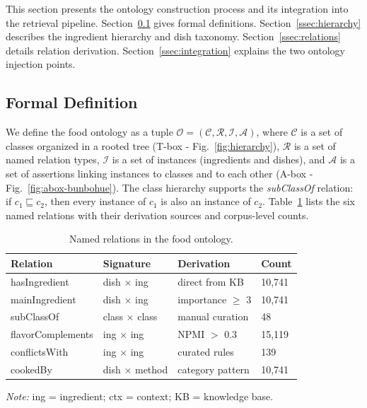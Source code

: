 \label{sec:framework}

This section presents the ontology construction process and its integration into the retrieval pipeline. Section~\ref{ssec:formal} gives formal definitions. Section~\ref{ssec:hierarchy} describes the ingredient hierarchy and dish taxonomy. Section~\ref{ssec:relations} details relation derivation. Section~\ref{ssec:integration} explains the two ontology injection points.

\subsection{Formal Definition}
\label{ssec:formal}

We define the food ontology as a tuple $\mathcal{O} = (\mathcal{C}, \mathcal{R}, \mathcal{I}, \mathcal{A})$, where $\mathcal{C}$ is a set of classes organized in a rooted tree (T-box - Fig.~\ref{fig:hierarchy}), $\mathcal{R}$ is a set of named relation types, $\mathcal{I}$ is a set of instances (ingredients and dishes), and $\mathcal{A}$ is a set of assertions linking instances to classes and to each other (A-box - Fig.~\ref{fig:abox-bunbohue}). The class hierarchy supports the \emph{subClassOf} relation: if $c_1 \sqsubseteq c_2$, then every instance of $c_1$ is also an instance of $c_2$. Table~\ref{tab:relations} lists the six named relations with their derivation sources and corpus-level counts.

\begin{table}[t]
\centering
\caption{Named relations in the food ontology.}
\label{tab:relations}
\small
\begin{tabular}{llll}
\toprule
\textbf{Relation} & \textbf{Signature} & \textbf{Derivation} & \textbf{Count} \\
\midrule
hasIngredient      & dish $\times$ ing            & direct from KB     & 10{,}741 \\
mainIngredient     & dish $\times$ ing            & importance $\geq$ 3 & 10{,}741 \\
subClassOf         & class $\times$ class         & manual curation    & 48 \\
flavorComplements  & ing $\times$ ing             & NPMI $>$ 0.3      & 15{,}119 \\
conflictsWith      & ing $\times$ ing             & curated rules      & 139 \\
cookedBy           & dish $\times$ method         & category pattern   & 10{,}741 \\
\bottomrule
\end{tabular}
\vspace{2pt}
  \par\noindent\footnotesize\textit{Note:} ing = ingredient; ctx = context; KB = knowledge base.
\end{table}

